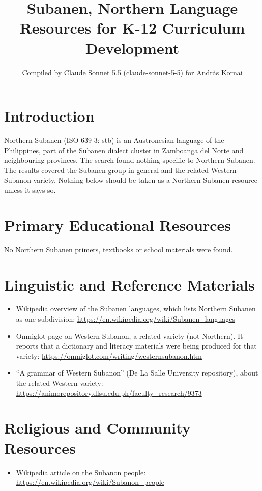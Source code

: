 \documentclass[12pt]{article}
\title{Subanen, Northern Language Resources for K-12 Curriculum Development}
\author{Compiled by Claude Sonnet 5.5 (claude-sonnet-5-5) for Andr\'as Kornai}
\date{}
\begin{document}
\maketitle

\section{Introduction}
Northern Subanen (ISO 639-3: stb) is an Austronesian language of the Philippines, part of the Subanen dialect cluster in Zamboanga del Norte and neighbouring provinces. The search found nothing specific to Northern Subanen. The results covered the Subanen group in general and the related Western Subanon variety. Nothing below should be taken as a Northern Subanen resource unless it says so.

\section{Primary Educational Resources}
No Northern Subanen primers, textbooks or school materials were found.

\section{Linguistic and Reference Materials}
\begin{itemize}
\item Wikipedia overview of the Subanen languages, which lists Northern Subanen as one subdivision: \url{https://en.wikipedia.org/wiki/Subanen_languages}
\item Omniglot page on Western Subanon, a related variety (not Northern). It reports that a dictionary and literacy materials were being produced for that variety: \url{https://omniglot.com/writing/westernsubanon.htm}
\item ``A grammar of Western Subanon'' (De La Salle University repository), about the related Western variety: \url{https://animorepository.dlsu.edu.ph/faculty_research/9373}
\end{itemize}

\section{Religious and Community Resources}
\begin{itemize}
\item Wikipedia article on the Subanon people: \url{https://en.wikipedia.org/wiki/Subanon_people}
\end{itemize}
\end{document}
